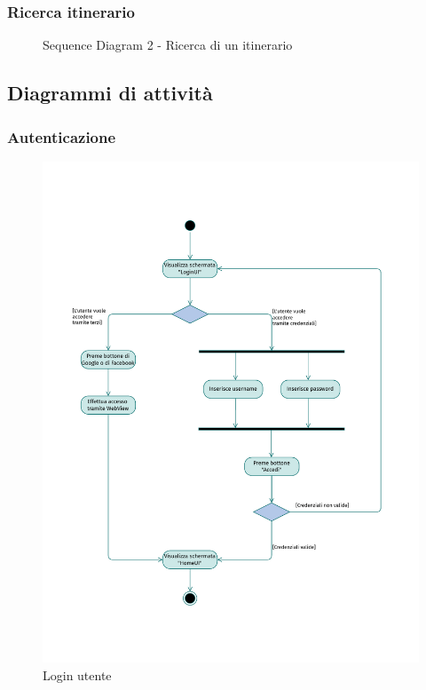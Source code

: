 \documentclass{natourDoc}
\begin{document}
\newpage
\subsubsection{Ricerca itinerario}
\begin{figure}[!htbp]
	\centering
	
	\caption{Sequence Diagram 2 - Ricerca di un itinerario}
\end{figure}
\FloatBarrier

\newpage
\subsection{Diagrammi di attività}
\subsubsection{Autenticazione}
\begin{figure}[!htbp]
	\centering
	\includegraphics[width=\textwidth, page=1]{./diagrams/activity.pdf}
	\caption{Login utente}
\end{figure}
\FloatBarrier
\end{document}
